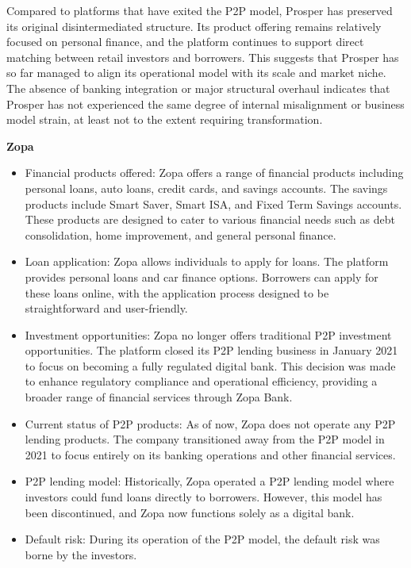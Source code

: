 \documentclass[pdflatex,sn-apa]{sn-jnl}%
\theoremstyle{thmstyleone}%
\theoremstyle{thmstyletwo}%
\theoremstyle{thmstylethree}%
\begin{document}
Compared to platforms that have exited the P2P model, Prosper has preserved its original disintermediated structure. Its product offering remains relatively focused on personal finance, and the platform continues to support direct matching between retail investors and borrowers. This suggests that Prosper has so far managed to align its operational model with its scale and market niche. The absence of banking integration or major structural overhaul indicates that Prosper has not experienced the same degree of internal misalignment or business model strain, at least not to the extent requiring transformation.

\vspace{1\baselineskip}
\textbf{Zopa}
\begin{itemize} 
\item Financial products offered: Zopa offers a range of financial products including personal loans, auto loans, credit cards, and savings accounts. The savings products include Smart Saver, Smart ISA, and Fixed Term Savings accounts. These products are designed to cater to various financial needs such as debt consolidation, home improvement, and general personal finance.
\item Loan application: Zopa allows individuals to apply for loans. The platform provides personal loans and car finance options. Borrowers can apply for these loans online, with the application process designed to be straightforward and user-friendly.
\item Investment opportunities: Zopa no longer offers traditional P2P investment opportunities. The platform closed its P2P lending business in January 2021 to focus on becoming a fully regulated digital bank. This decision was made to enhance regulatory compliance and operational efficiency, providing a broader range of financial services through Zopa Bank.
\item Current status of P2P products: As of now, Zopa does not operate any P2P lending products. The company transitioned away from the P2P model in 2021 to focus entirely on its banking operations and other financial services.
\item P2P lending model: Historically, Zopa operated a P2P lending model where investors could fund loans directly to borrowers. However, this model has been discontinued, and Zopa now functions solely as a digital bank.
\item Default risk: During its operation of the P2P model, the default risk was borne by the investors.
\end{itemize}
\end{document}
